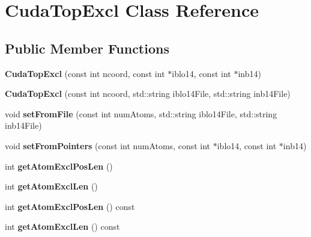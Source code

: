 \hypertarget{classCudaTopExcl}{}\section{Cuda\+Top\+Excl Class Reference}
\label{classCudaTopExcl}
\subsection*{Public Member Functions}
\begin{DoxyCompactItemize}
\item 
\hypertarget{classCudaTopExcl_a5ec43fd8116eb88ecac9ea1c0cb54abf}{}\label{classCudaTopExcl_a5ec43fd8116eb88ecac9ea1c0cb54abf} 
{\bfseries Cuda\+Top\+Excl} (const int ncoord, const int $\ast$iblo14, const int $\ast$inb14)
\item 
\hypertarget{classCudaTopExcl_a2a244c80f305406b2d23d02874861793}{}\label{classCudaTopExcl_a2a244c80f305406b2d23d02874861793} 
{\bfseries Cuda\+Top\+Excl} (const int ncoord, std\+::string iblo14\+File, std\+::string inb14\+File)
\item 
\hypertarget{classCudaTopExcl_ad1371d59d9893fe18f13611c0dbf3ba3}{}\label{classCudaTopExcl_ad1371d59d9893fe18f13611c0dbf3ba3} 
void {\bfseries set\+From\+File} (const int num\+Atoms, std\+::string iblo14\+File, std\+::string inb14\+File)
\item 
\hypertarget{classCudaTopExcl_ad17c4599504dfd5c88a0529c3a49869b}{}\label{classCudaTopExcl_ad17c4599504dfd5c88a0529c3a49869b} 
void {\bfseries set\+From\+Pointers} (const int num\+Atoms, const int $\ast$iblo14, const int $\ast$inb14)
\item 
\hypertarget{classCudaTopExcl_a6bc858ee8d32017df14389fe28c5b9dd}{}\label{classCudaTopExcl_a6bc858ee8d32017df14389fe28c5b9dd} 
int {\bfseries get\+Atom\+Excl\+Pos\+Len} ()
\item 
\hypertarget{classCudaTopExcl_a4410c3045c751b928a25e72c690f9b7d}{}\label{classCudaTopExcl_a4410c3045c751b928a25e72c690f9b7d} 
int {\bfseries get\+Atom\+Excl\+Len} ()
\item 
\hypertarget{classCudaTopExcl_a6118b2743b391239be7a084b646f41bc}{}\label{classCudaTopExcl_a6118b2743b391239be7a084b646f41bc} 
int {\bfseries get\+Atom\+Excl\+Pos\+Len} () const
\item 
\hypertarget{classCudaTopExcl_ad17cec753b9afbe7fd582eec2fdd8ca2}{}\label{classCudaTopExcl_ad17cec753b9afbe7fd582eec2fdd8ca2} 
int {\bfseries get\+Atom\+Excl\+Len} () const
\item 
\hypertarget{classCudaTopExcl_af682699504552a77bb0f0223956009f0}{}\label{classCudaTopExcl_af682699504552a77bb0f0223956009f0} 

\end{DoxyCompactItemize}
